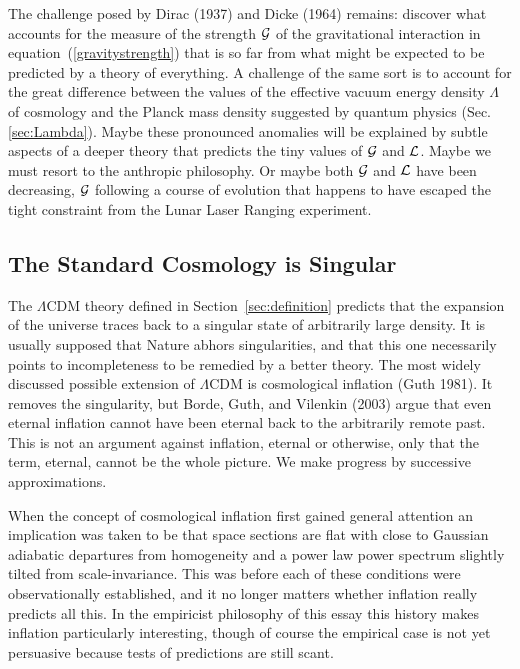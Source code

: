 \documentclass[fleqn,usenatbib]{mnras}
\begin{document}
The challenge posed by Dirac (1937) and Dicke (1964) remains: discover what accounts for the measure of the strength ${\cal G}$ of the gravitational interaction in equation~(\ref{gravitystrength}) that is so far from what might be expected to be predicted by a theory of everything. A challenge of the same sort is to account for the great difference between the values of the effective vacuum energy density $\Lambda$ of cosmology and the Planck mass density suggested by quantum physics (Sec.\ref{sec:Lambda}). Maybe these  pronounced anomalies will be explained by subtle aspects of a deeper theory that predicts the tiny values of ${\cal G}$ and $\cal L$. Maybe we must resort to the anthropic philosophy. Or maybe both ${\cal G}$ and $\cal L$ have been decreasing, ${\cal G}$ following a course of evolution that happens to have escaped the tight constraint from the Lunar Laser Ranging experiment. 

\subsection{The Standard Cosmology is Singular}

The $\Lambda$CDM theory defined in Section~\ref{sec:definition} predicts that the expansion of the universe traces back to a singular state of arbitrarily large density. It is usually supposed that Nature abhors singularities, and that this one necessarily points to incompleteness to be remedied by a better theory. The most widely discussed possible extension of $\Lambda$CDM is cosmological inflation (Guth 1981). It removes the singularity, but Borde, Guth, and Vilenkin (2003) argue that even eternal inflation cannot have been eternal back to the arbitrarily remote past. This is not an argument against inflation, eternal or otherwise, only that the term, eternal, cannot be the whole picture. We make progress by successive approximations.

When the concept of cosmological inflation first gained general attention an  implication was taken to be that space sections are flat with close to Gaussian adiabatic departures from homogeneity and a power law power spectrum slightly tilted from scale-invariance. This was before each of these conditions were  observationally established, and it no longer matters whether inflation really predicts all this. In the empiricist philosophy of this essay this history makes inflation particularly interesting, though of course the empirical case is not yet persuasive because tests of predictions are still scant.
\end{document}
